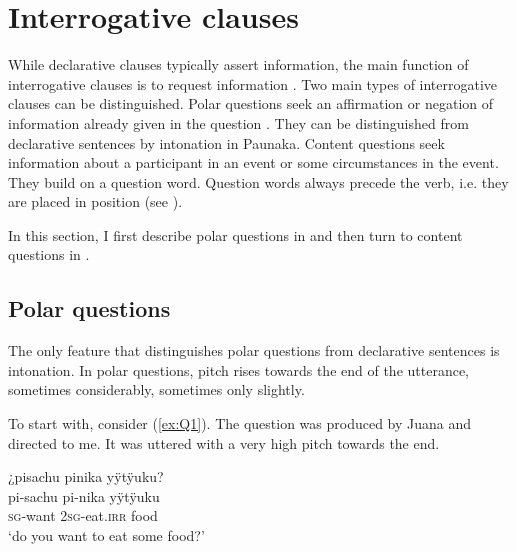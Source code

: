 
\section{Interrogative clauses}\label{sec:Questions}

While declarative clauses typically assert information, the main function of interrogative clauses is to request information \citep[294]{Payne1997}. Two main types of interrogative clauses can be distinguished. Polar questions seek an affirmation or negation of information already given in the question \citep[291]{Koenig2007}. They can be distinguished from declarative sentences by intonation in Paunaka. Content questions seek information about a participant in an event or some circumstances in the event. They build on a question word. Question words always precede the verb, i.e. they are placed in  position (see ).

In this section, I first describe polar questions in  and then turn to content questions in .


\subsection{Polar questions}\label{sec:PolarQuestions}

The only feature that distinguishes polar questions from declarative sentences is intonation. In polar questions, pitch rises towards the end of the utterance, sometimes considerably, sometimes only slightly.


To start with, consider (\ref{ex:Q1}). The question was produced by Juana and directed to me. It was uttered with a very high pitch towards the end.

\ea\label{ex:Q1}
\begingl
\glpreamble ¿pisachu pinika yÿtÿuku?\\
\gla pi-sachu pi-nika yÿtÿuku\\
\textsc{sg}-want 2\textsc{sg}-eat.\textsc{irr} food\\
\glft ‘do you want to eat some food?’
\endgl
\trailingcitation{[jxx-d110923l-2.45]}
\xe

